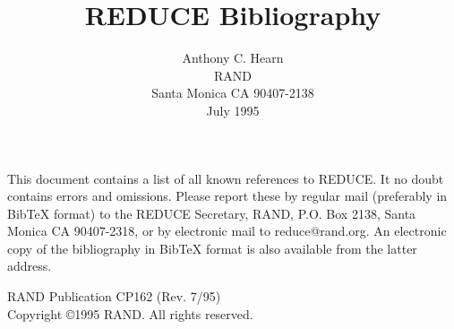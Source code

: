 %
%
\def\thebibliography#1{\section*{}\list
 {[\arabic{enumi}]}{\settowidth\labelwidth{[#1]}\leftmargin\labelwidth
 \advance\leftmargin\labelsep
 \usecounter{enumi}}
 \def\newblock{\hskip .11em plus .33em minus .07em}
 \sloppy\clubpenalty4000\widowpenalty4000
 \sfcode`\.=1000\relax}
\textwidth 6.6in\textheight 9in\columnwidth\textwidth
\hoffset-2cm

\setcounter{page}{0}
\title{REDUCE Bibliography}
\author{Anthony C. Hearn\\
RAND \\
Santa Monica CA 90407-2138  \vspace {.5cm} \\
July 1995}
\date{}
\maketitle
\vspace{1cm}
This document contains a list of all known references to REDUCE.  It no doubt
contains errors and omissions.  Please report these by regular mail
(preferably in BibTeX format) to the REDUCE Secretary, RAND, P.O. Box 2138,
Santa Monica CA 90407-2318, or by electronic mail to reduce@rand.org.  An
electronic copy of the bibliography in BibTeX format is also available from
the latter address.
\begin{center}
\vspace{9.0cm}
RAND Publication CP162 (Rev. 7/95) \vspace*{.5cm} \\
Copyright \copyright 1995 RAND.  All rights reserved.
\end{center}
\newpage
\voffset-2.5cm

